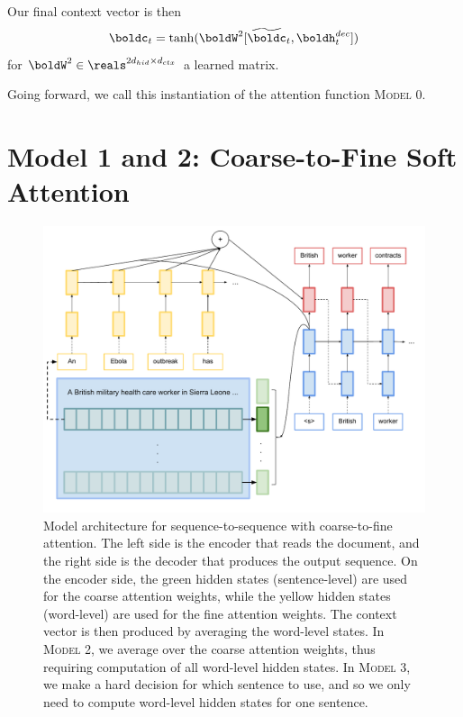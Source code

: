\documentclass[12pt]{report}
\begin{document}
Our final context vector is then
\begin{equation}
\boldc_t = \tanh(\boldW^2[\widetilde{\boldc}_t, \boldh_t^{dec}])
\end{equation}
for $\boldW^2 \in \reals^{2d_{hid} \times d_{ctx}}$ a learned matrix.

Going forward, we call this instantiation of the attention function \textsc{Model 0}.


\section{Model 1 and 2: Coarse-to-Fine Soft Attention}

\begin{figure}
\includegraphics[width=\textwidth]{images/coarse_to_fine.pdf}
\caption{Model architecture for sequence-to-sequence with coarse-to-fine attention. The left side is the encoder that reads the document, and the right side is the decoder that produces the output sequence. On the encoder side, the green hidden states (sentence-level) are used for the coarse attention weights, while the yellow hidden states (word-level) are used for the fine attention weights. The context vector is then produced by averaging the word-level states. In \textsc{Model 2}, we average over the coarse attention weights, thus requiring computation of all word-level hidden states. In \textsc{Model 3}, we make a hard decision for which sentence to use, and so we only need to compute word-level hidden states for one sentence.}
\label{fig:coarsetofine}
\end{figure}
\end{document}
